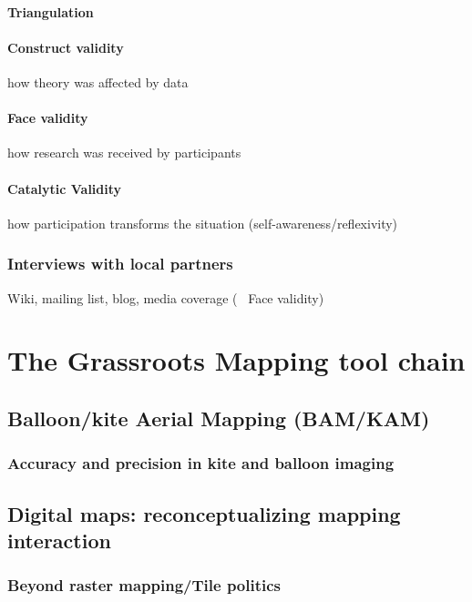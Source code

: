 \documentclass[11pt]{report}
\begin{document}
\subsubsection{Triangulation}
\subsubsection{Construct validity}
how theory was affected by data
\subsubsection{Face validity}
how research was received by participants
\subsubsection{Catalytic Validity}
how participation transforms the situation (self-awareness/reflexivity)

\subsection{Interviews with local partners}
Wiki, mailing list, blog, media coverage (~ Face validity)

\chapter{The Grassroots Mapping tool chain}
\section{Balloon/kite Aerial Mapping (BAM/KAM)}
\subsection{Accuracy and precision in kite and balloon imaging}

\section{Digital maps: reconceptualizing mapping interaction}
\subsection{Beyond raster mapping/Tile politics}
\end{document}
